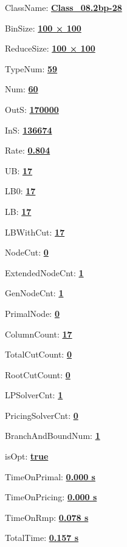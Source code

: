 \documentclass[11pt]{article}
\begin{document}
\pagestyle{empty}


ClassName: \underline{\textbf{Class_08.2bp-28}}
\par
BinSize: \underline{\textbf{100 × 100}}
\par
ReduceSize: \underline{\textbf{100 × 100}}
\par
TypeNum: \underline{\textbf{59}}
\par
Num: \underline{\textbf{60}}
\par
OutS: \underline{\textbf{170000}}
\par
InS: \underline{\textbf{136674}}
\par
Rate: \underline{\textbf{0.804}}
\par
UB: \underline{\textbf{17}}
\par
LB0: \underline{\textbf{17}}
\par
LB: \underline{\textbf{17}}
\par
LBWithCut: \underline{\textbf{17}}
\par
NodeCut: \underline{\textbf{0}}
\par
ExtendedNodeCnt: \underline{\textbf{1}}
\par
GenNodeCnt: \underline{\textbf{1}}
\par
PrimalNode: \underline{\textbf{0}}
\par
ColumnCount: \underline{\textbf{17}}
\par
TotalCutCount: \underline{\textbf{0}}
\par
RootCutCount: \underline{\textbf{0}}
\par
LPSolverCnt: \underline{\textbf{1}}
\par
PricingSolverCnt: \underline{\textbf{0}}
\par
BranchAndBoundNum: \underline{\textbf{1}}
\par
isOpt: \underline{\textbf{true}}
\par
TimeOnPrimal: \underline{\textbf{0.000 s}}
\par
TimeOnPricing: \underline{\textbf{0.000 s}}
\par
TimeOnRmp: \underline{\textbf{0.078 s}}
\par
TotalTime: \underline{\textbf{0.157 s}}
\par
\newpage


\end{document}
